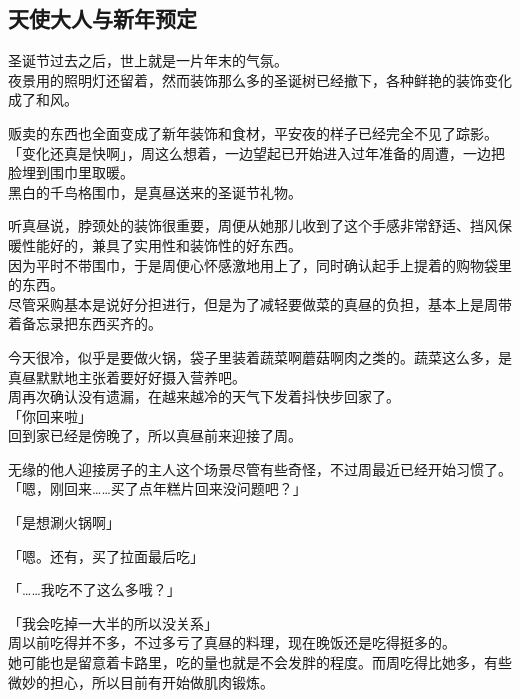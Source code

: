 \subsection{天使大人与新年预定}

圣诞节过去之后，世上就是一片年末的气氛。\\

夜景用的照明灯还留着，然而装饰那么多的圣诞树已经撤下，各种鲜艳的装饰变化成了和风。

贩卖的东西也全面变成了新年装饰和食材，平安夜的样子已经完全不见了踪影。\\

「变化还真是快啊」，周这么想着，一边望起已开始进入过年准备的周遭，一边把脸埋到围巾里取暖。\\

黑白的千鸟格围巾，是真昼送来的圣诞节礼物。

听真昼说，脖颈处的装饰很重要，周便从她那儿收到了这个手感非常舒适、挡风保暖性能好的，兼具了实用性和装饰性的好东西。\\

因为平时不带围巾，于是周便心怀感激地用上了，同时确认起手上提着的购物袋里的东西。\\

尽管采购基本是说好分担进行，但是为了减轻要做菜的真昼的负担，基本上是周带着备忘录把东西买齐的。

今天很冷，似乎是要做火锅，袋子里装着蔬菜啊蘑菇啊肉之类的。蔬菜这么多，是真昼默默地主张着要好好摄入营养吧。\\

周再次确认没有遗漏，在越来越冷的天气下发着抖快步回家了。\\

「你回来啦」\\

回到家已经是傍晚了，所以真昼前来迎接了周。

无缘的他人迎接房子的主人这个场景尽管有些奇怪，不过周最近已经开始习惯了。\\

「嗯，刚回来……买了点年糕片回来没问题吧？」

「是想涮火锅啊」

「嗯。还有，买了拉面最后吃」

「……我吃不了这么多哦？」

「我会吃掉一大半的所以没关系」\\

周以前吃得并不多，不过多亏了真昼的料理，现在晚饭还是吃得挺多的。\\

她可能也是留意着卡路里，吃的量也就是不会发胖的程度。而周吃得比她多，有些微妙的担心，所以目前有开始做肌肉锻炼。\\

